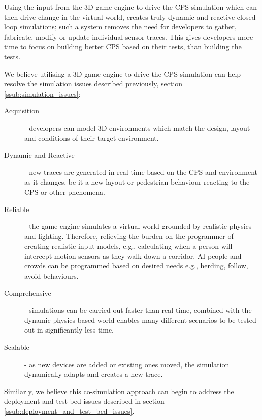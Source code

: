  Using the input from the 3D game engine to drive the CPS simulation which can then drive change in the virtual world, creates truly dynamic and reactive closed-loop simulations; such a system removes the need for developers to gather, fabricate, modify or update individual sensor traces. This gives developers more time to focus on building better CPS based on their tests, than building the tests.

 We believe utilising a 3D game engine to drive the CPS simulation can help resolve the simulation issues described previously, section \ref{ssub:simulation_issues}:
 \begin{description}
  \item [Acquisition] - developers can model 3D environments which match the design, layout and conditions of their target environment.
  \item [Dynamic and Reactive] - new traces are generated in real-time based on the CPS and environment as it changes, be it a new layout or pedestrian behaviour reacting to the CPS or other phenomena.
  \item [Reliable] - the game engine simulates a virtual world grounded by realistic physics and lighting. Therefore, relieving the burden on the programmer of creating realistic input models, e.g., calculating when a person will intercept motion sensors as they walk down a corridor. AI people and crowds can be programmed based on desired needs e.g., herding, follow, avoid behaviours.
  \item [Comprehensive] - simulations can be carried out faster than real-time, combined with the dynamic physics-based world enables many different scenarios to be tested out in significantly less time.
  \item [Scalable] - as new devices are added or existing ones moved, the simulation dynamically adapts and creates a new trace.
\end{description}

Similarly, we believe this co-simulation approach can begin to address the deployment and test-bed issues described in section \ref{ssub:deployment_and_test_bed_issues}.

